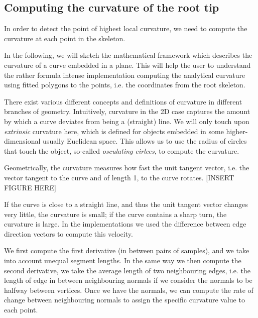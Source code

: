 \subsection{Computing the curvature of the root tip}


In order to detect the point of highest local curvature, we need to compute the curvature at each point in the skeleton. 


In the following, we will sketch the mathematical framework which describes the curvature of a curve embedded in a plane.
This will help the user to understand the rather formula intense implementation computing the analytical curvature using fitted polygons to the points, i.e. the coordinates from the root skeleton.

There exist various different concepts and definitions of curvature in different branches of geometry.
Intuitively, curvature in the 2D case captures the amount by which a curve deviates from being a (straight) line.
We will only touch upon \textit{extrinsic} curvature here, which is defined for objects embedded in some higher-dimensional usually Euclidean space. This allows us to use the radius of circles that touch the object, so-called \textit{osculating cirlces}, to compute the curvature.


Geometrically, the curvature measures how fast the unit tangent vector, i.e. the vector tangent to the curve and of length 1,  to the curve rotates. 
[INSERT FIGURE HERE]

If the curve is close to a straight line, and thus the unit tangent vector changes very little, the curvature is small; if the curve contains a sharp turn, the curvature is large.
In the implementations we used the difference between edge direction vectors to compute this velocity.




We first compute the first derivative (in between pairs of samples), and we take into account unequal segment lengths. In the same way we then compute the second derivative, we take the average length of two neighbouring edges, i.e. the length of edge in between neighbouring normals if we consider the normals to be halfway between vertices.
Once we have the normals, we can compute the rate of change between neighbouring normals to assign the specific curvature value to each point.

